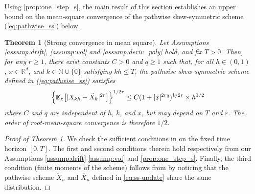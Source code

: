 \documentclass[11pt]{article}
\newtheorem{theorem}{Theorem}
\begin{document}
Using \cref{prop:one_step_s}, the main result of this section establishes an upper bound on the mean-square convergence of the pathwise skew-symmetric scheme (\ref{eq:pathwise_ss}) below.
% 
\begin{theorem}[Strong convergence in mean square] \label{thm:main_strong}
Let Assumptions \ref{assump:drift}, \ref{assump:vol} and
\ref{assump:deriv_poly} hold, and fix $T>0$. Then, for any
$r\geq 1$, there exist constants $C>0$ and $q\geq 1$ such that,
for all $h\in(0,1)$, $x\in\mathbb{R}^d$, and
$k\in\mathbb{N} \cup\{0\}$ satisfying $kh\leq T$, the pathwise
skew-symmetric scheme defined in (\ref{eq:pathwise_ss}) satisfies
% 
\begin{align}
\Bigl\{  \mathbb{E}_x \bigl[  |  X_{k h} - \widetilde{X}_{k} |^{2r} \bigr] \Bigr\}^{{1}/{2r}} \le C ( 1 +  |x|^{2rq})^{{1}/{2r}} \times h^{{1}/{2}}
\end{align}
% 
where $C$ and $q$ are independent of $h$, $k$, and $x$, but may
depend on $T$ and $r$. The order of root-mean-square convergence is therefore ${1}/{2}$. 
\end{theorem} 
% 
\begin{proof}[Proof of Theorem \ref{thm:main_strong}]
We check the sufficient conditions in \cite[Theorem 2.1]{Tret:13} on the fixed time horizon $[0,T]$. The first and second conditions therein hold respectively from our Assumptions \ref{assump:drift}-\ref{assump:vol} and \cref{prop:one_step_s}.  %
Finally, the third condition (finite moments of the scheme) follows from \cite[Lemma C.2]{skew:ima} by noticing that the pathwise scheme $\widetilde{X}_n$ and $\bar{X}_n$ defined in \eqref{eq:ss-update} share the same distribution. %
\end{proof} 
\end{document}
